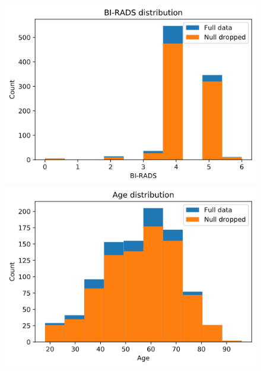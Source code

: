 \documentclass[11pt,a4paper]{article}
\begin{document}
\begin{figure}[H]
    \centering
    
    \begin{minipage}{0.5\textwidth}
        \centering
        \includegraphics[scale=0.35]{img/birads-distribution.png}
    \end{minipage}%
    \begin{minipage}{0.5\textwidth}
        \centering
        \includegraphics[scale=0.35]{img/age-distribution.png}
    \end{minipage}
    
\end{figure}
    
\end{document}
